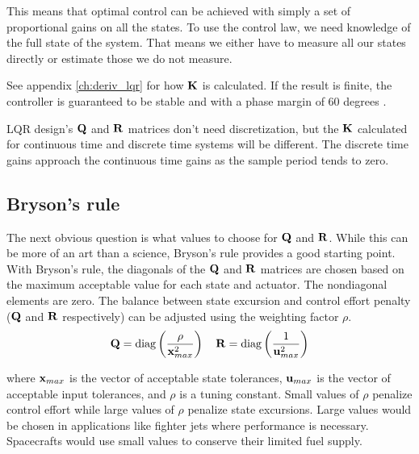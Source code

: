 This means that optimal control can be achieved with simply a set of
proportional gains on all the \glspl{state}. To use the \gls{control law}, we
need knowledge of the full \gls{state} of the \gls{system}. That means we either
have to measure all our \glspl{state} directly or estimate those we do not
measure.

See appendix \ref{ch:deriv_lqr} for how $\mathbf{K}$ is calculated. If the result
is finite, the controller is guaranteed to be stable and
 with a \gls{phase margin} of 60 degrees
\cite{bib:lqr_phase_margin}.
\begin{remark}
  LQR design's $\mathbf{Q}$ and $\mathbf{R}$ matrices don't need \gls{discretization},
  but the $\mathbf{K}$ calculated for continuous time and discrete time
  \glspl{system} will be different. The discrete time gains approach the
  continuous time gains as the sample period tends to zero.
\end{remark}

\subsection{Bryson's rule}

The next obvious question is what values to choose for $\mathbf{Q}$ and $\mathbf{R}$.
While this can be more of an art than a science, Bryson's rule provides a good
starting point. With Bryson's rule, the diagonals of the $\mathbf{Q}$ and $\mathbf{R}$
matrices are chosen based on the maximum acceptable value for each \gls{state}
and actuator. The nondiagonal elements are zero. The balance between state
excursion and control effort penalty ($\mathbf{Q}$ and $\mathbf{R}$ respectively) can
be adjusted using the weighting factor $\rho$.
\begin{equation*}
  \mathbf{Q} = \operatorname{diag}\left(\frac{\rho}{\mathbf{x}_{max}^2}\right)
  \quad
  \mathbf{R} = \operatorname{diag}\left(\frac{1}{\mathbf{u}_{max}^2}\right)
\end{equation*}

where $\mathbf{x}_{max}$ is the vector of acceptable state tolerances,
$\mathbf{u}_{max}$ is the vector of acceptable input tolerances, and $\rho$ is a
tuning constant. Small values of $\rho$ penalize \gls{control effort} while
large values of $\rho$ penalize \gls{state} excursions. Large values would be
chosen in applications like fighter jets where performance is necessary.
Spacecrafts would use small values to conserve their limited fuel supply.

